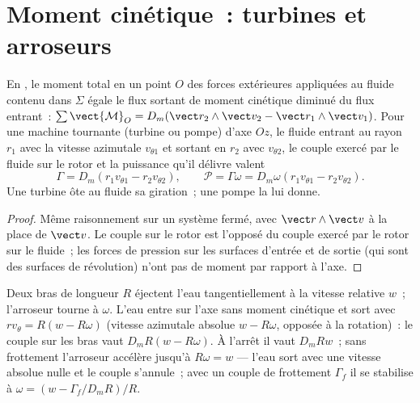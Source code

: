 \section{Moment cinétique~: turbines et arroseurs}

\begin{theorem}\label{thm:b2:flow-balances:angular}
En , le moment total en un point $O$ des forces
extérieures appliquées au fluide contenu dans $\Sigma$ égale le flux sortant de moment cinétique
diminué du flux entrant~: $\sum\vect{\mathcal M}_O = D_m(\vect r_2\wedge\vect v_2 - \vect r_1
\wedge\vect v_1)$. Pour une machine tournante (turbine ou pompe) d'axe $Oz$,
le fluide entrant au rayon $r_1$ avec la vitesse azimutale
$v_{\theta1}$ et sortant en $r_2$ avec $v_{\theta2}$, le couple exercé par
le fluide sur le rotor et la puissance qu'il délivre valent
\[
\Gamma = D_m(r_1v_{\theta1} - r_2v_{\theta2}) , \qquad
\mathcal P = \Gamma\omega = D_m\omega(r_1v_{\theta1} - r_2v_{\theta2}) .
\]
Une turbine ôte au fluide sa giration~; une pompe la lui donne.
\end{theorem}

\begin{proof}
Même raisonnement sur un système fermé, avec $\vect r\wedge\vect v$ à la place de
$\vect v$. Le couple sur le rotor est l'opposé du couple exercé par le
rotor sur le fluide~; les forces de pression sur les surfaces d'entrée et de sortie
(qui sont des surfaces de révolution) n'ont pas de moment par rapport à
l'axe.
\end{proof}

\begin{example}\label{ex:b2:flow-balances:sprinkler}
Deux bras de longueur $R$ éjectent l'eau tangentiellement à la vitesse relative
$w$~; l'arroseur tourne à $\omega$. L'eau entre sur l'axe sans
moment cinétique et sort avec $r v_\theta = R(w - R\omega)$ (vitesse
azimutale absolue $w - R\omega$, opposée à la rotation)~: le couple sur les
bras vaut $D_mR(w - R\omega)$. À l'arrêt il vaut $D_mRw$~; sans frottement l'arroseur
accélère jusqu'à $R\omega = w$ --- l'eau sort avec une vitesse
absolue nulle et le couple s'annule~; avec un couple de frottement
$\Gamma_f$ il se stabilise à $\omega = (w - \Gamma_f/D_mR)/R$.
\end{example}

